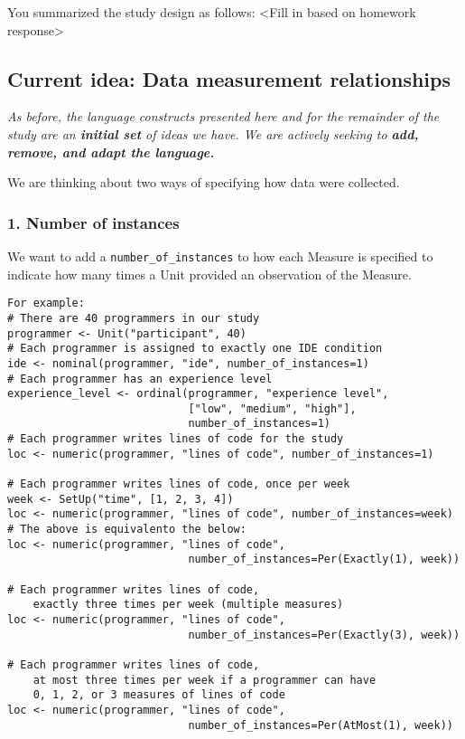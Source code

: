 You summarized the study design as follows: <Fill in based on homework response>

\subsection*{Current idea: Data measurement relationships}

\emph{As before, the language constructs presented here and for the
remainder of the study are an \textbf{initial set} of ideas we have. We
are actively seeking to \textbf{add, remove, and adapt the language.}}

We are thinking about two ways of specifying how data were collected.

\subsubsection{1. Number of instances}

We want to add a \texttt{number\_of\_instances} to how each Measure is
specified to indicate how many times a Unit provided an observation of
the Measure.

\begin{verbatim}
For example:
# There are 40 programmers in our study
programmer <- Unit("participant", 40)
# Each programmer is assigned to exactly one IDE condition
ide <- nominal(programmer, "ide", number_of_instances=1)
# Each programmer has an experience level
experience_level <- ordinal(programmer, "experience level", 
                            ["low", "medium", "high"], 
                            number_of_instances=1)
# Each programmer writes lines of code for the study
loc <- numeric(programmer, "lines of code", number_of_instances=1)

# Each programmer writes lines of code, once per week
week <- SetUp("time", [1, 2, 3, 4])
loc <- numeric(programmer, "lines of code", number_of_instances=week)
# The above is equivalento the below: 
loc <- numeric(programmer, "lines of code", 
                            number_of_instances=Per(Exactly(1), week))

# Each programmer writes lines of code, 
    exactly three times per week (multiple measures)
loc <- numeric(programmer, "lines of code", 
                            number_of_instances=Per(Exactly(3), week))

# Each programmer writes lines of code, 
    at most three times per week if a programmer can have 
    0, 1, 2, or 3 measures of lines of code 
loc <- numeric(programmer, "lines of code", 
                            number_of_instances=Per(AtMost(1), week))
\end{verbatim}

